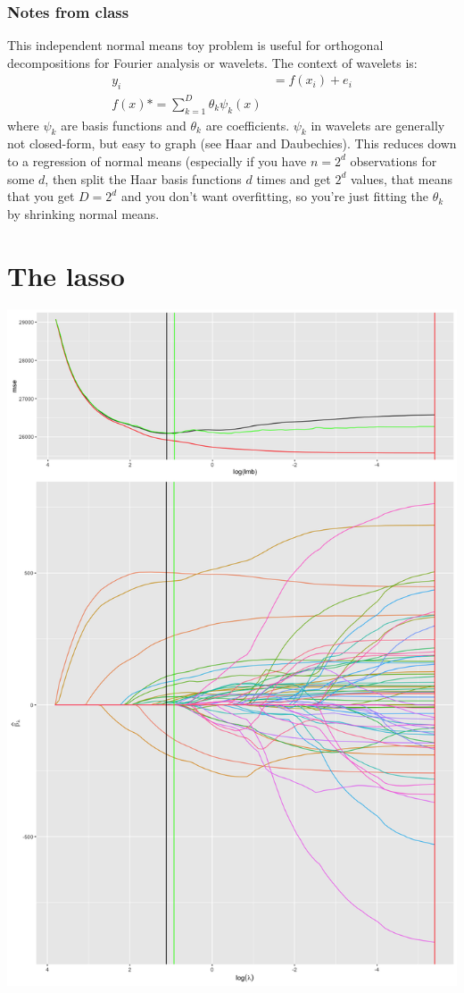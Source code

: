 \documentclass{article}
\begin{document}
\subsubsection{Notes from class}
This independent normal means toy problem is useful for orthogonal decompositions for Fourier analysis or wavelets.
The context of wavelets is:
\begin{align*}
y_i&=f(x_i)+e_i\\
f(x)*=\sum_{k=1}^D \theta_k \psi_k(x)
\end{align*}
where $\psi_k$ are basis functions and $\theta_k$ are coefficients. $\psi_k$ in wavelets are generally not closed-form, but
easy to graph (see Haar and Daubechies). This reduces down to a regression of normal means (especially if you have $n=2^d$ observations for some $d$, then split the Haar basis functions $d$ times and get $2^d$ values, that means
that you get $D=2^d$ and you don't want overfitting, so you're just fitting the $\theta_k$ by shrinking normal means.


\section{The lasso}

\includegraphics[scale=0.35]{overall.png}
\end{document}
